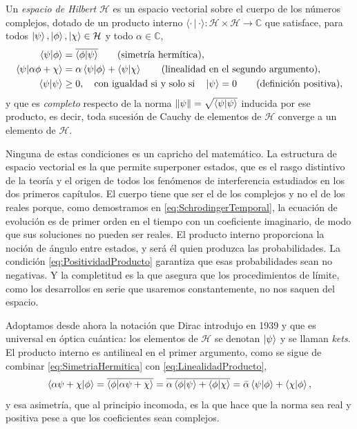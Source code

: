         \begin{myDef}\label{def:Hilbert}
            Un \textit{espacio de Hilbert} $\mathcal{H}$ es un espacio vectorial sobre el cuerpo de los números complejos, dotado de un producto interno $\langle\cdot\,|\,\cdot\rangle : \mathcal{H}\times\mathcal{H}\rightarrow\mathbb{C}$ que satisface, para todos $\ket{\psi},\ket{\phi},\ket{\chi}\in\mathcal{H}$ y todo $\alpha\in\mathbb{C}$,
            \begin{align}
                \braket{\psi|\phi} &= \overline{\braket{\phi|\psi}} \qquad\text{(simetría hermítica)},\label{eq:SimetriaHermitica}\\
                \braket{\psi|\alpha\phi + \chi} &= \alpha\braket{\psi|\phi} + \braket{\psi|\chi} \qquad\text{(linealidad en el segundo argumento)},\label{eq:LinealidadProducto}\\
                \braket{\psi|\psi} &\geq 0, \quad\text{con igualdad si y solo si}\quad \ket{\psi} = 0 \qquad\text{(definición positiva)},\label{eq:PositividadProducto}
            \end{align}
            y que es \textit{completo} respecto de la norma $\|\psi\| = \sqrt{\braket{\psi|\psi}}$ inducida por ese producto, es decir, toda sucesión de Cauchy de elementos de $\mathcal{H}$ converge a un elemento de $\mathcal{H}$.
        \end{myDef}

        Ninguna de estas condiciones es un capricho del matemático. La estructura de espacio vectorial es la que permite superponer estados, que es el rasgo distintivo de la teoría y el origen de todos los fenómenos de interferencia estudiados en los dos primeros capítulos. El cuerpo tiene que ser el de los complejos y no el de los reales porque, como demostramos en \eqref{eq:SchrodingerTemporal}, la ecuación de evolución es de primer orden en el tiempo con un coeficiente imaginario, de modo que sus soluciones no pueden ser reales. El producto interno proporciona la noción de ángulo entre estados, y será él quien produzca las probabilidades. La condición \eqref{eq:PositividadProducto} garantiza que esas probabilidades sean no negativas. Y la completitud es la que asegura que los procedimientos de límite, como los desarrollos en serie que usaremos constantemente, no nos saquen del espacio.

        Adoptamos desde ahora la notación que Dirac introdujo en 1939 y que es universal en óptica cuántica: los elementos de $\mathcal{H}$ se denotan $\ket{\psi}$ y se llaman \textit{kets}. El producto interno es antilineal en el primer argumento, como se sigue de combinar \eqref{eq:SimetriaHermitica} con \eqref{eq:LinealidadProducto},
        \begin{equation}\label{eq:Antilinealidad}
            \braket{\alpha\psi + \chi|\phi} = \overline{\braket{\phi|\alpha\psi+\chi}} = \overline{\alpha\braket{\phi|\psi} + \braket{\phi|\chi}} = \bar{\alpha}\braket{\psi|\phi} + \braket{\chi|\phi},
        \end{equation}
        y esa asimetría, que al principio incomoda, es la que hace que la norma sea real y positiva pese a que los coeficientes sean complejos.

